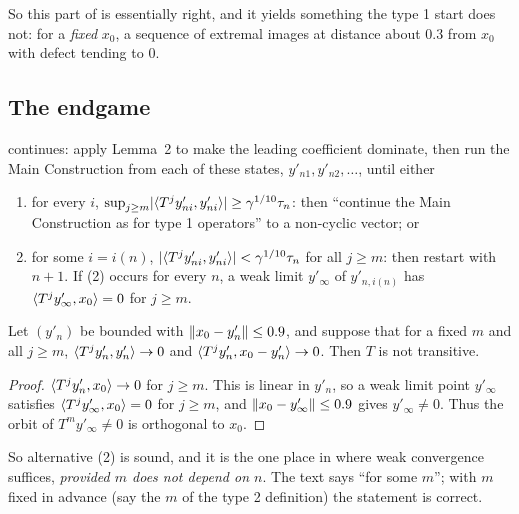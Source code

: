 So this part of \paper{} is essentially right, and it yields something the type 1 start does
not: for a \emph{fixed} $x_0$, a sequence of extremal images at distance about $0.3$ from $x_0$
with defect tending to $0$.

\subsection{The endgame}
\paper{} continues: apply Lemma~2 to make the leading coefficient dominate, then run the Main
Construction from each of these states, $y'_{n1},y'_{n2},\dots$, until either
\begin{enumerate}[label=(\arabic*)]
\item for every $i$, $\sup_{j\ge m}\lvert \langle T^jy'_{ni},y'_{ni}\rangle\rvert\ge\gamma^{1/10}\tau_n$: then
``continue the Main Construction as for type 1 operators'' to a non-cyclic vector; or
\item for some $i=i(n)$, $\lvert \langle T^jy'_{ni},y'_{ni}\rangle\rvert<\gamma^{1/10}\tau_n$ for all
$j\ge m$: then restart with $n+1$. If (2) occurs for every $n$, a weak limit $y'_\infty$ of
$y'_{n,i(n)}$ has $\langle T^jy'_\infty,x_0\rangle=0$ for $j\ge m$.
\end{enumerate}

\begin{lemma}\label{lem:type2weak}\stproved{}
Let $(y'_n)$ be bounded with $\lVert x_0-y'_n\rVert\le0.9$, and suppose that for a fixed $m$ and all
$j\ge m$, $\langle T^jy'_n,y'_n\rangle\to0$ and $\langle T^jy'_n,x_0-y'_n\rangle\to0$. Then $T$ is not transitive.
\end{lemma}
\begin{proof}
$\langle T^jy'_n,x_0\rangle\to0$ for $j\ge m$. This is linear in $y'_n$, so a weak limit point
$y'_\infty$ satisfies $\langle T^jy'_\infty,x_0\rangle=0$ for $j\ge m$, and
$\lVert x_0-y'_\infty\rVert\le0.9$ gives $y'_\infty\ne0$. Thus the orbit of $T^my'_\infty\ne0$ is
orthogonal to $x_0$.
\end{proof}

So alternative (2) is sound, and it is the one place in \paper{} where weak convergence
suffices, \emph{provided $m$ does not depend on $n$}. The text says ``for some $m$''; with $m$
fixed in advance (say the $m$ of the type 2 definition) the statement is correct.

